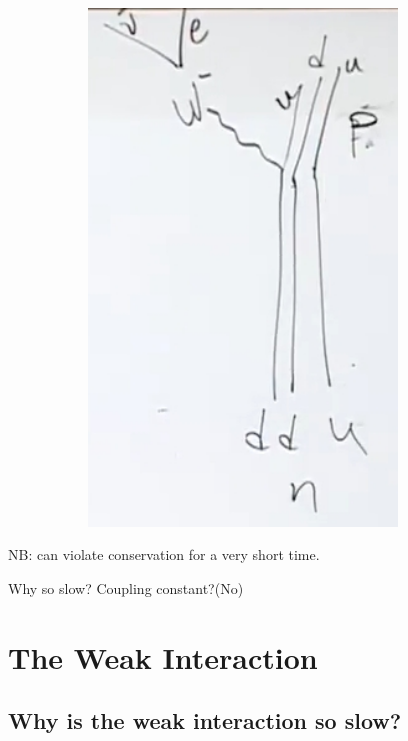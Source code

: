 \documentclass[]{article}
\begin{document}
\begin{figure}[H]
\begin{subfigure}{0.30\textwidth}
		\includegraphics[width=0.9\textwidth]{2-5-neutron-decay}
	\end{subfigure}
\end{figure}

NB: can violate conservation for a very short time.

Why so slow? Coupling constant?(No)

\section{The Weak Interaction}

\subsection{Why is the weak interaction so slow?}
\end{document}

